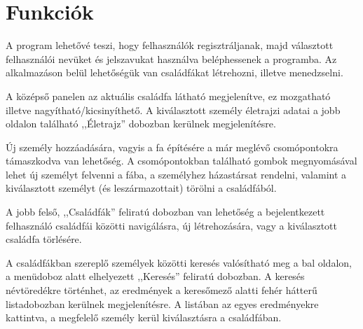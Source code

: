 \section{Funkciók}\label{sect:rsz_funkciok}

A program lehetővé teszi, hogy felhasználók regisztráljanak, majd választott felhasználói nevüket és jelszavukat használva beléphessenek a programba. Az alkalmazáson belül lehetőségük van családfákat létrehozni, illetve menedzselni.

A középső panelen az aktuális családfa látható megjelenítve, ez mozgatható illetve nagyítható/kicsinyíthető. A kiválasztott személy életrajzi adatai a jobb oldalon található ,,Életrajz'' dobozban kerülnek megjelenítésre.

Új személy hozzáadására, vagyis a fa építésére a már meglévő csomópontokra támaszkodva van lehetőség. A csomópontokban található gombok megnyomásával lehet új személyt felvenni a fába, a személyhez házastársat rendelni, valamint a kiválasztott személyt (és leszármazottait) törölni a családfából.

A jobb felső, ,,Családfák'' feliratú dobozban van lehetőség a bejelentkezett felhasználó családfái közötti navigálásra, új létrehozására, vagy a kiválasztott családfa törlésére.

A családfákban szereplő személyek közötti keresés valósítható meg a bal oldalon, a menüdoboz alatt elhelyezett ,,Keresés'' feliratú dobozban. A keresés névtöredékre történhet, az eredmények a keresőmező alatti fehér hátterű listadobozban kerülnek megjelenítésre. A listában az egyes eredményekre kattintva, a megfelelő személy kerül kiválasztásra a családfában.
